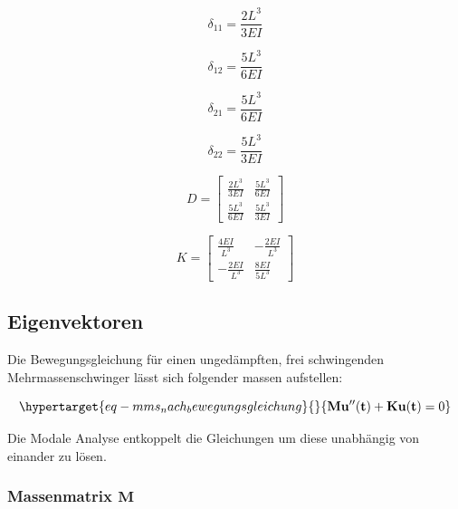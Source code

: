 \documentclass[
  letterpaper,
  DIV=11]{scrreprt}
\begin{document}
\begin{equation}\delta_{11} = \frac{2 L^{3}}{3 EI}\end{equation}

\begin{equation}\delta_{12} = \frac{5 L^{3}}{6 EI}\end{equation}

\begin{equation}\delta_{21} = \frac{5 L^{3}}{6 EI}\end{equation}

\begin{equation}\delta_{22} = \frac{5 L^{3}}{3 EI}\end{equation}

\begin{equation}D = \left[\begin{matrix}\frac{2 L^{3}}{3 EI} & \frac{5 L^{3}}{6 EI}\\\frac{5 L^{3}}{6 EI} & \frac{5 L^{3}}{3 EI}\end{matrix}\right]\end{equation}

\begin{equation}K = \left[\begin{matrix}\frac{4 EI}{L^{3}} & - \frac{2 EI}{L^{3}}\\- \frac{2 EI}{L^{3}} & \frac{8 EI}{5 L^{3}}\end{matrix}\right]\end{equation}

\hypertarget{eigenvektoren-1}{%
\subsection{Eigenvektoren}\label{eigenvektoren-1}}

Die Bewegungsgleichung für einen ungedämpften, frei schwingenden
Mehrmassenschwinger lässt sich folgender massen aufstellen:

\begin{equation}\protect\hypertarget{eq-mms_nach_bewegungsgleichung}{}{
\mathbf{M u''(t) + K u(t)} = 0
}\label{eq-mms_nach_bewegungsgleichung}\end{equation}

Die Modale Analyse entkoppelt die Gleichungen um diese unabhängig von
einander zu lösen.

\hypertarget{massenmatrix-mathbfm-1}{%
\subsubsection{\texorpdfstring{Massenmatrix
\(\mathbf{M}\)}{Massenmatrix \textbackslash mathbf\{M\}}}\label{massenmatrix-mathbfm-1}}
\end{document}
